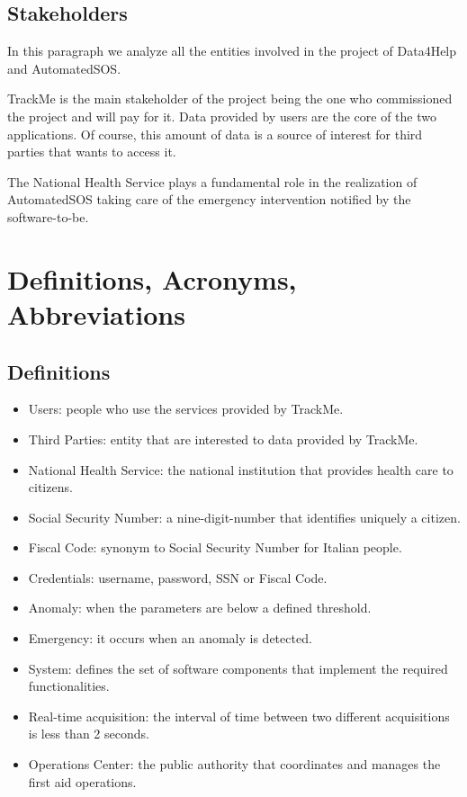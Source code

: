 \subsection{Stakeholders}
In this paragraph we analyze all the entities involved in the project of Data4Help and AutomatedSOS.
\par TrackMe is the main stakeholder of the project being the one who commissioned the project and will pay for it.
Data provided by users are the core of the two applications.
Of course, this amount of data is a source of interest for third parties that wants to access it.
\par The National Health Service plays a fundamental role in the realization of AutomatedSOS taking care of the emergency intervention notified by the software-to-be.

\section{Definitions, Acronyms, Abbreviations}
\subsection{Definitions}
\begin{itemize}
    \item Users: people who use the services provided by TrackMe.
    \item Third Parties: entity that are interested to data provided by TrackMe.
    \item National Health Service: the national institution that provides health care to citizens.
    \item Social Security Number: a nine-digit-number that identifies uniquely a citizen.
    \item Fiscal Code: synonym to Social Security Number for Italian people.
    \item Credentials: username, password, SSN or Fiscal Code.
    \item Anomaly: when the parameters are below a defined threshold. 
    \item Emergency: it occurs when an anomaly is detected.
    \item System: defines the set of software components that implement the required functionalities.
    \item Real-time acquisition: the interval of time between two different acquisitions is less than 2 seconds.
    \item Operations Center: the public authority that coordinates and manages the first aid operations.
\end{itemize}

